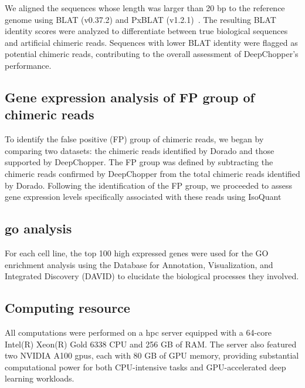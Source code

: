 \documentclass[pdflatex, sn-mathphys-num, lineno]{sn-jnl}%
\theoremstyle{thmstyleone}%
\theoremstyle{thmstyletwo}%
\theoremstyle{thmstylethree}%
\begin{document}
We aligned the sequences whose length was larger than 20 bp to the reference genome using BLAT (v0.37.2) and PxBLAT (v1.2.1)~\cite{kent2002blat, li2024pxblat}.
The resulting BLAT identity scores were analyzed to differentiate between true biological sequences and artificial chimeric reads.
Sequences with lower BLAT identity were flagged as potential chimeric reads, contributing to the overall assessment of DeepChopper's performance.


\subsection{Gene expression analysis of FP group of chimeric reads}

To identify the false positive (FP) group of chimeric reads, we began by comparing two datasets: the chimeric reads identified by Dorado and those supported by DeepChopper. The FP group was defined by subtracting the chimeric reads confirmed by DeepChopper from the total chimeric reads identified by Dorado. Following the identification of the FP group, we proceeded to assess gene expression levels specifically associated with these reads using IsoQuant\cite{IsoQuant}


\subsection{\gls{go} analysis}

For each cell line, the top 100 high expressed genes were used for the GO enrichment analysis using the Database for Annotation, Visualization, and Integrated Discovery (DAVID)\cite{david} to elucidate the biological processes they involved.

\subsection{Computing resource}

All computations were performed on a \gls{hpc} server equipped with a 64-core Intel(R) Xeon(R) Gold 6338 CPU and 256 GB of RAM.
The server also featured two NVIDIA A100 \glspl{gpu}, each with 80 GB of GPU memory, providing substantial computational power for both CPU-intensive tasks and GPU-accelerated deep learning workloads.


\end{document}
